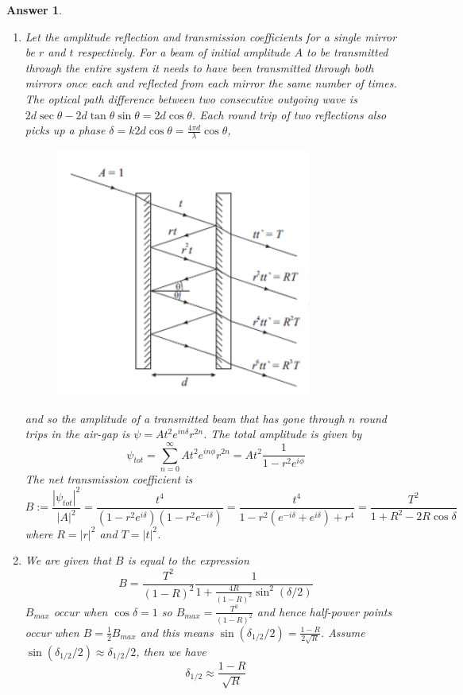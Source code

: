 \documentclass[a4paper]{article}
\newtheorem{ans}{Answer}[subsection]
\theoremstyle{new}
\begin{document}
\begin{ans}\leavevmode
\begin{enumerate}[label=(\roman*)]
\item Let the amplitude reflection and transmission coefficients for a single mirror be $r$ and $t$ respectively. For a beam of initial amplitude $A$ to be transmitted through the entire system it needs to have been transmitted through both mirrors once each and reflected from each mirror the same number of times. The optical path difference between two consecutive outgoing wave is $2d\sec\theta-2d\tan\theta\sin\theta=2d\cos\theta$. Each round trip of two reflections also picks up a phase $\delta=k2d\cos\theta=\frac{4\pi d}{\lambda}\cos\theta$,
\begin{figure}[H]
    \centering
    \includegraphics[scale=0.75]{2016P2B9ii.PNG}
\end{figure}
and so the amplitude of a transmitted beam that has gone through $n$ round trips in the air-gap is $\psi=At^2e^{in\delta}r^{2n}$. The total amplitude is given by
$$\psi_{tot}=\sum_{n=0}^\infty At^2e^{in\phi}r^{2n}=At^2\frac{1}{1-r^2e^{i\phi}}$$
The net transmission coefficient is
$$B:=\frac{|\psi_{tot}|^2}{|A|^2}=\frac{t^4}{(1-r^2e^{i\delta})(1-r^2e^{-i\delta})}=\frac{t^4}{1-r^2(e^{-i\delta}+e^{i\delta})+r^4}=\frac{T^2}{1+R^2-2R\cos\delta}$$
where $R=|r|^2$ and $T=|t|^2$.
\item We are given that $B$ is equal to the expression
$$B=\frac{T^2}{(1-R)^2}\frac{1}{1+\frac{4R}{(1-R)^2}\sin^2(\delta/2)}$$
$B_{max}$ occur when $\cos\delta=1$ so $B_{max}=\frac{T^2}{(1-R)^2}$ and hence half-power points occur when $B=\frac{1}{2}B_{max}$ and this means $\sin(\delta_{1/2}/2)=\frac{1-R}{2\sqrt{R}}$. Assume $\sin(\delta_{1/2}/2)\approx\delta_{1/2}/2$, then we have
$$\delta_{1/2}\approx\frac{1-R}{\sqrt{R}}$$

\end{enumerate}
\end{ans}
\end{document}
